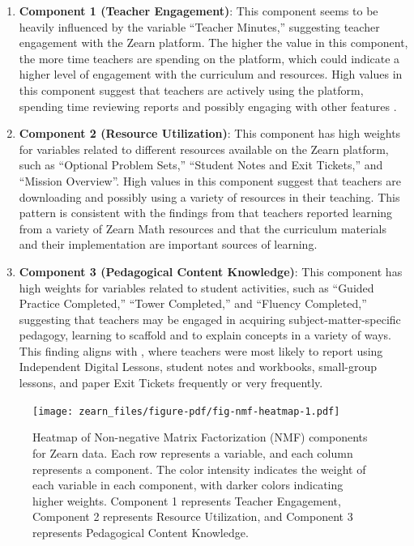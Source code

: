 \documentclass[
  number,
  preprint,
  3p,
  onecolumn]{elsarticle}
\begin{document}
\begin{enumerate}
\def\labelenumi{\arabic{enumi}.}
\item
  \textbf{Component 1 (Teacher Engagement)}: This component seems to be
  heavily influenced by the variable ``Teacher Minutes,'' suggesting
  teacher engagement with the Zearn platform. The higher the value in
  this component, the more time teachers are spending on the platform,
  which could indicate a higher level of engagement with the curriculum
  and resources. High values in this component suggest that teachers are
  actively using the platform, spending time reviewing reports and
  possibly engaging with other features \citep{morrison2019}.
\item
  \textbf{Component 2 (Resource Utilization)}: This component has high
  weights for variables related to different resources available on the
  Zearn platform, such as ``Optional Problem Sets,'' ``Student Notes and
  Exit Tickets,'' and ``Mission Overview''. High values in this
  component suggest that teachers are downloading and possibly using a
  variety of resources in their teaching. This pattern is consistent
  with the findings from \citep{knudsen2020} that teachers reported
  learning from a variety of Zearn Math resources and that the
  curriculum materials and their implementation are important sources of
  learning.
\item
  \textbf{Component 3 (Pedagogical Content Knowledge)}: This component
  has high weights for variables related to student activities, such as
  ``Guided Practice Completed,'' ``Tower Completed,'' and ``Fluency
  Completed,'' suggesting that teachers may be engaged in acquiring
  subject-matter-specific pedagogy, learning to scaffold and to explain
  concepts in a variety of ways. This finding aligns with
  \citep{morrison2019}, where teachers were most likely to report using
  Independent Digital Lessons, student notes and workbooks, small-group
  lessons, and paper Exit Tickets frequently or very frequently.
\end{enumerate}

\begin{figure}

{\centering \texttt{[image: zearn\_files/figure-pdf/fig-nmf-heatmap-1.pdf]}

}

\caption{\label{fig-nmf-heatmap}Heatmap of Non-negative Matrix
Factorization (NMF) components for Zearn data. Each row represents a
variable, and each column represents a component. The color intensity
indicates the weight of each variable in each component, with darker
colors indicating higher weights. Component 1 represents Teacher
Engagement, Component 2 represents Resource Utilization, and Component 3
represents Pedagogical Content Knowledge.}

\end{figure}
\end{document}
